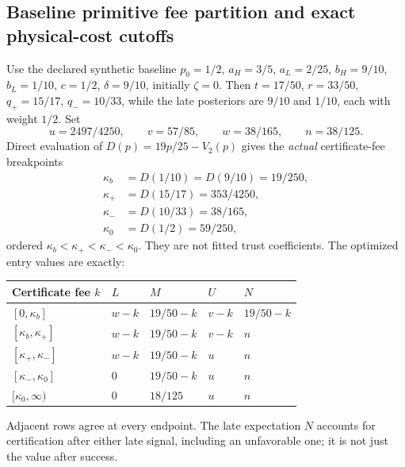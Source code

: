 \documentclass[11pt]{article}
\begin{document}
\subsection{Baseline primitive fee partition and exact physical-cost cutoffs}\label{sec:baselinepartition}
Use the declared synthetic baseline $p_0=1/2$, $a_H=3/5$, $a_L=2/25$, $b_H=9/10$, $b_L=1/10$, $c=1/2$, $\delta=9/10$, initially $\zeta=0$. Then $t=17/50$, $r=33/50$, $q_+=15/17$, $q_-=10/33$, while the late posteriors are $9/10$ and $1/10$, each with weight $1/2$. Set
\[
 u=2497/4250,\qquad v=57/85,\qquad w=38/165,\qquad n=38/125.
\]
Direct evaluation of $D(p)=19p/25-V_2(p)$ gives the \emph{actual} certificate-fee breakpoints
\begin{align*}
 \kappa_b&=D(1/10)=D(9/10)=19/250,\\
 \kappa_+&=D(15/17)=353/4250,\\
 \kappa_-&=D(10/33)=38/165,\\
 \kappa_0&=D(1/2)=59/250,
\end{align*}
ordered $\kappa_b<\kappa_+<\kappa_-<\kappa_0$. They are not fitted trust coefficients. The optimized entry values are exactly:
\begin{center}\small
\begin{tabular}{lllll}\toprule
Certificate fee $k$ & $L$ & $M$ & $U$ & $N$\\\midrule
$[0,\kappa_b]$ & $w-k$ & $19/50-k$ & $v-k$ & $19/50-k$\\
$[\kappa_b,\kappa_+]$ & $w-k$ & $19/50-k$ & $v-k$ & $n$\\
$[\kappa_+,\kappa_-]$ & $w-k$ & $19/50-k$ & $u$ & $n$\\
$[\kappa_-,\kappa_0]$ & $0$ & $19/50-k$ & $u$ & $n$\\
$[\kappa_0,\infty)$ & $0$ & $18/125$ & $u$ & $n$\\\bottomrule
\end{tabular}
\end{center}
Adjacent rows agree at every endpoint. The late expectation $N$ accounts for certification after either late signal, including an unfavorable one; it is not just the value after success.
\end{document}
